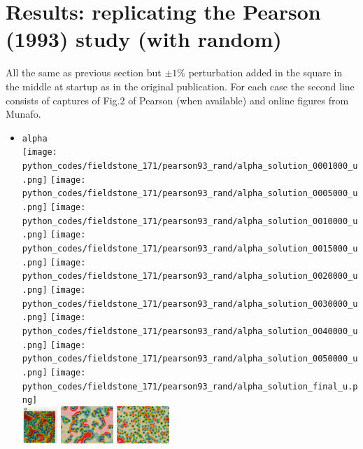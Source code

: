\newpage
\section*{Results: replicating the Pearson (1993) study (with random)}

All the same as previous section but $\pm 1\%$ perturbation added in the square 
in the middle at startup as in the original publication.
For each case the second line consists of captures of Fig.2 of Pearson (when available) and online figures from Munafo.

\begin{itemize}
\item {\tt alpha}\\
\texttt{[image: python\_codes/fieldstone\_171/pearson93\_rand/alpha\_solution\_0001000\_u.png]}
\texttt{[image: python\_codes/fieldstone\_171/pearson93\_rand/alpha\_solution\_0005000\_u.png]}
\texttt{[image: python\_codes/fieldstone\_171/pearson93\_rand/alpha\_solution\_0010000\_u.png]}
\texttt{[image: python\_codes/fieldstone\_171/pearson93\_rand/alpha\_solution\_0015000\_u.png]}
\texttt{[image: python\_codes/fieldstone\_171/pearson93\_rand/alpha\_solution\_0020000\_u.png]}
\texttt{[image: python\_codes/fieldstone\_171/pearson93\_rand/alpha\_solution\_0030000\_u.png]}
\texttt{[image: python\_codes/fieldstone\_171/pearson93\_rand/alpha\_solution\_0040000\_u.png]}
\texttt{[image: python\_codes/fieldstone\_171/pearson93\_rand/alpha\_solution\_0050000\_u.png]}
\texttt{[image: python\_codes/fieldstone\_171/pearson93\_rand/alpha\_solution\_final\_u.png]}\\
\includegraphics[height=1.4cm]{python_codes/fieldstone_171/images/pear93_alpha}
\includegraphics[height=1.4cm]{python_codes/fieldstone_171/images/munafo_alpha1}
\includegraphics[height=1.4cm]{python_codes/fieldstone_171/images/munafo_alpha2}


\end{itemize}
